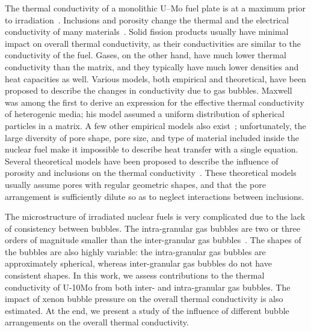 The thermal conductivity of a monolithic U--Mo fuel plate is at a maximum prior to irradiation~\cite{burkes2015thermal}.
Inclusions and porosity change the thermal and the electrical conductivity of many materials~\cite{bakker1997using}. 
Solid fission products usually have minimal impact on overall thermal conductivity, as their conductivities are similar to the conductivity of the fuel. Gases, on the other hand, have much lower thermal conductivity than
the matrix, and they typically have much lower densities and heat capacities as well. Various models, both empirical and theoretical, have been proposed to describe the changes in conductivity due to gas bubbles. Maxwell~\cite{maxwell1881treatise} was among the first to derive an expression for the effective thermal conductivity of heterogenic media; his model assumed a uniform distribution of spherical particles in a matrix. A few other empirical models also exist~\cite{macewan1967effect,goldsmith1973measurements,devries1989experimental}; unfortunately, the large diversity of pore shape, pore size, and type of material included inside the nuclear fuel make it impossible to describe heat transfer with a single equation. Several theoretical models have been proposed to describe the influence of porosity and inclusions on the thermal conductivity~\cite{maxwell1881treatise,loeb1954thermal, cunningham1981heat, tzou1991effect, bauer1993general}. These theoretical models usually assume pores with regular geometric shapes, and that the pore arrangement is sufficiently dilute so as to neglect interactions between inclusions.

The microstructure of irradiated nuclear fuels is very complicated due to the lack of consistency between bubbles. The intra-granular gas bubbles are two or three orders of magnitude smaller than the inter-granular gas bubbles~\cite{hu2015assessment}. The shapes of the bubbles are also highly variable: the intra-granular gas bubbles are approximately spherical, whereas inter-granular gas bubbles do not have consistent shapes. In this work, we assess contributions to the thermal conductivity of \mbox{U-10Mo} from both inter- and intra-granular gas bubbles. The impact of xenon bubble pressure on the overall thermal conductivity is also estimated. At the end, we present a study of the influence of different bubble arrangements on the overall thermal conductivity.

